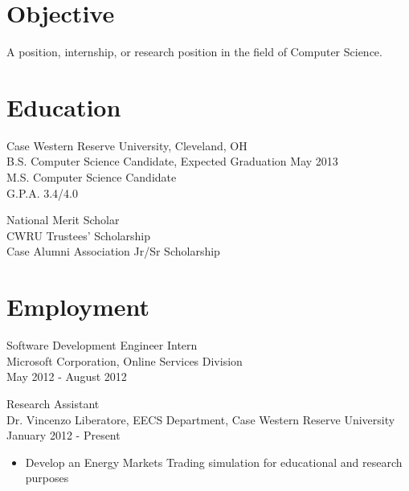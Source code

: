 \documentclass{res} %
\begin{document}
 


  \address{{\bf Present Address} \\   2058 E. 115th St. \\ Cleveland, OH 44106}
  \address{{\bf Permanent Address} \\ 1896 Apple Valley Rd.\\ Bolingbrook, IL 60490}
                                               
  \begin{resume}
   
  \section{Objective}
    A position, internship, or research position in the field of Computer Science.
   
  \section{Education} 
    Case Western Reserve University, Cleveland, OH \\
    B.S. Computer Science Candidate, Expected Graduation May 2013 \\
    M.S. Computer Science Candidate \\
    G.P.A. 3.4/4.0

    National Merit Scholar \\
    CWRU Trustees' Scholarship \\
    Case Alumni Association Jr/Sr Scholarship
   
  \section{Employment} 
    Software Development Engineer Intern \\
    Microsoft Corporation, Online Services Division \\
    May 2012 - August 2012

    Research Assistant \\
    Dr. Vincenzo Liberatore, EECS Department, Case Western Reserve University \\
    January 2012 - Present
    \begin{itemize} \itemsep -2pt
      \item Develop an Energy Markets Trading simulation for educational and research purposes
    \end{itemize}


\end{resume}
\end{document}
